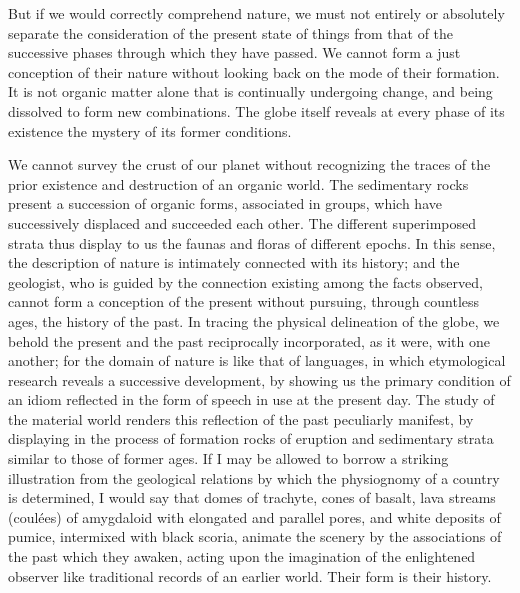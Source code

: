 But if we would correctly comprehend nature, we must not entirely or absolutely separate the consideration of the present state of things from that of the successive phases through which they have passed. We cannot form a just conception of their nature without looking back on the mode of their formation. It is not organic matter alone that is continually undergoing change, and being dissolved to form new combinations. The globe itself reveals at every phase of its existence the mystery of its former conditions.

We cannot survey the crust of our planet without recognizing the traces of the prior existence and destruction of an organic world. The sedimentary rocks present a succession of organic forms, associated in groups, which have successively displaced and succeeded each other. The different superimposed strata thus display to us the faunas and floras of different epochs. In this sense, the description of nature is intimately connected with its history; and the geologist, who is guided by the connection existing among the facts observed, cannot form a conception of the present without pursuing, through countless ages, the history of the past. In tracing the physical delineation of the globe, we behold the present and the past reciprocally incorporated, as it were, with one another; for the domain of nature is like that of languages, in which etymological research reveals a successive development, by showing us the primary condition of an idiom reflected in the form of speech in use at the present day. The study of the material world renders this reflection of the past peculiarly manifest, by displaying in the process of formation rocks of eruption and sedimentary strata similar to those of former ages. If I may be allowed to borrow a striking illustration from the geological relations by which the physiognomy of a country is determined, I would say that domes of trachyte, cones of basalt, lava streams (coulées) of amygdaloid with elongated and parallel pores, and white deposits of pumice, intermixed with black scoria, animate the scenery by the associations of the past which they awaken, acting upon the imagination of the enlightened observer like traditional records of an earlier world. Their form is their history.

